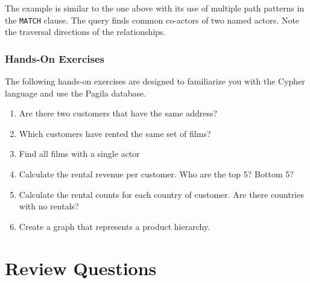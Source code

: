 The example is similar to the one above with its use of multiple path patterns in the \texttt{MATCH} clause. The query finds common co-actors of two named actors. Note the traversal directions of the relationships.

\begin{tcolorbox}[colback=code]
\subsubsection*{Hands-On Exercises}

The following hands-on exercises are designed to familiarize you with the Cypher language and use the Pagila database.

\begin{enumerate}[nosep]
	\item Are there two customers that have the same address?
	\item Which customers have rented the same set of films?
	\item Find all films with a single actor
	\item Calculate the rental revenue per customer. Who are the top 5? Bottom 5?
	\item Calculate the rental counts for each country of customer. Are there countries with no rentals?
	\item Create a graph that represents a product hierarchy.
\end{enumerate}
\end{tcolorbox}

\section{Review Questions}

